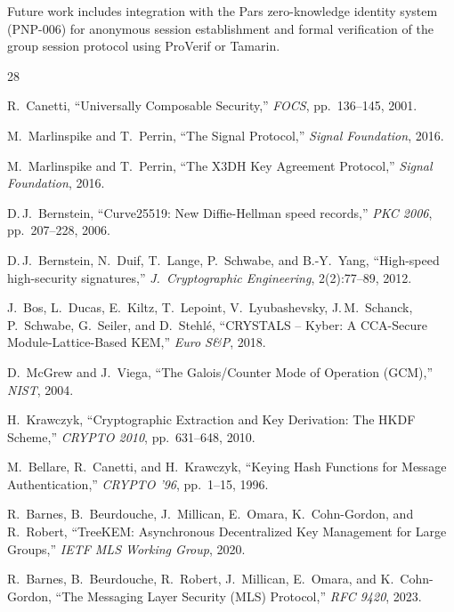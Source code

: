 \documentclass[11pt,a4paper]{article}
\begin{document}
Future work includes integration with the Pars zero-knowledge identity
system (PNP-006) for anonymous session establishment and formal
verification of the group session protocol using ProVerif or Tamarin.


\begin{thebibliography}{28}

R.~Canetti,
``Universally Composable Security,''
\emph{FOCS}, pp.~136--145, 2001.

M.~Marlinspike and T.~Perrin,
``The Signal Protocol,''
\emph{Signal Foundation}, 2016.

M.~Marlinspike and T.~Perrin,
``The X3DH Key Agreement Protocol,''
\emph{Signal Foundation}, 2016.

D.\,J.~Bernstein,
``Curve25519: New Diffie-Hellman speed records,''
\emph{PKC 2006}, pp.~207--228, 2006.

D.\,J.~Bernstein, N.~Duif, T.~Lange, P.~Schwabe, and B.-Y.~Yang,
``High-speed high-security signatures,''
\emph{J.\ Cryptographic Engineering}, 2(2):77--89, 2012.

J.~Bos, L.~Ducas, E.~Kiltz, T.~Lepoint, V.~Lyubashevsky, J.\,M.~Schanck,
P.~Schwabe, G.~Seiler, and D.~Stehl\'e,
``CRYSTALS -- Kyber: A CCA-Secure Module-Lattice-Based KEM,''
\emph{Euro S\&P}, 2018.

D.~McGrew and J.~Viega,
``The Galois/Counter Mode of Operation (GCM),''
\emph{NIST}, 2004.

H.~Krawczyk,
``Cryptographic Extraction and Key Derivation: The HKDF Scheme,''
\emph{CRYPTO 2010}, pp.~631--648, 2010.

M.~Bellare, R.~Canetti, and H.~Krawczyk,
``Keying Hash Functions for Message Authentication,''
\emph{CRYPTO '96}, pp.~1--15, 1996.

R.~Barnes, B.~Beurdouche, J.~Millican, E.~Omara, K.~Cohn-Gordon, and
R.~Robert,
``TreeKEM: Asynchronous Decentralized Key Management for Large Groups,''
\emph{IETF MLS Working Group}, 2020.

R.~Barnes, B.~Beurdouche, R.~Robert, J.~Millican, E.~Omara, and
K.~Cohn-Gordon,
``The Messaging Layer Security (MLS) Protocol,''
\emph{RFC 9420}, 2023.


\end{thebibliography}
\end{document}
